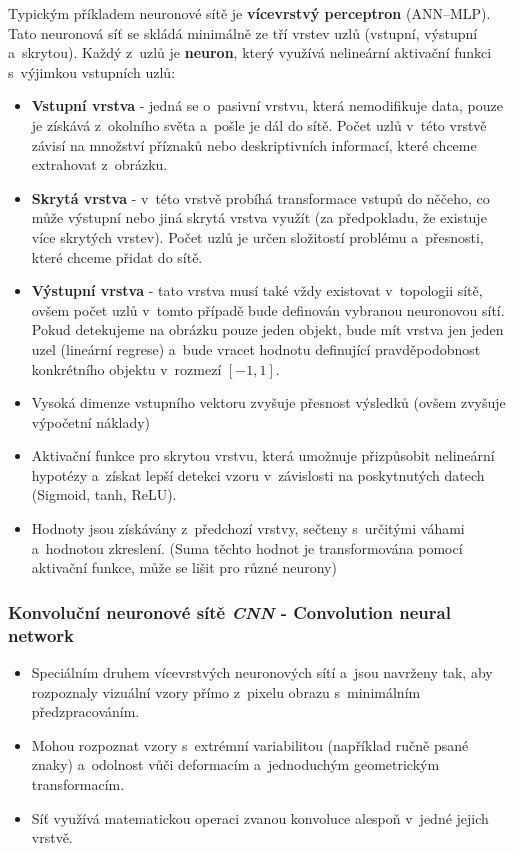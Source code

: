 Typickým příkladem neuronové sítě je \textbf{vícevrstvý perceptron} (ANN--MLP). Tato neuronová síť se skládá minimálně ze tří vrstev uzlů (vstupní, výstupní a~skrytou). Každý z~uzlů je \textbf{neuron}, který využívá nelineární aktivační funkci s~výjimkou vstupních uzlů:
\begin{itemize}
  \item{\textbf{Vstupní vrstva} - jedná se o~pasivní vrstvu, která nemodifikuje data, pouze je získává z~okolního světa a~pošle je dál do sítě. Počet uzlů v~této vrstvě závisí na množství příznaků nebo deskriptivních informací, které chceme extrahovat z~obrázku.}
  \item{\textbf{Skrytá vrstva} - v~této vrstvě probíhá transformace vstupů do něčeho, co může výstupní nebo jiná skrytá vrstva využít (za předpokladu, že existuje více skrytých vrstev). Počet uzlů je určen složitostí problému a~přesnosti, které chceme přidat do sítě.}
  \item{\textbf{Výstupní vrstva} - tato vrstva musí také vždy existovat v~topologii sítě, ovšem počet uzlů v~tomto případě bude definován vybranou neuronovou sítí. Pokud detekujeme na obrázku pouze jeden objekt, bude mít vrstva jen jeden uzel (lineární regrese) a~bude vracet hodnotu definující pravděpodobnost konkrétního objektu v~rozmezí $[-1,1]$.}
\end{itemize} 


\begin{itemize}
  \item Vysoká dimenze vstupního vektoru zvyšuje přesnost výsledků (ovšem zvyšuje výpočetní náklady)
  \item Aktivační funkce pro skrytou vrstvu, která umožnuje přizpůsobit nelineární hypotézy a~získat lepší detekci vzoru v~závislosti na poskytnutých datech (Sigmoid, tanh, ReLU).
  \item Hodnoty jsou získávány z~předchozí vrstvy, sečteny s~určitými váhami a~hodnotou zkreslení. (Suma těchto hodnot je transformována pomocí aktivační funkce, může se lišit pro různé neurony)
\end{itemize}

\subsubsection{Konvoluční neuronové sítě \textit{CNN} - Convolution neural network}
\begin{itemize}
  \item Speciálním druhem vícevrstvých neuronových sítí a~jsou navrženy tak, aby rozpoznaly vizuální vzory přímo z~pixelu obrazu s~minimálním předzpracováním.
  \item Mohou rozpoznat vzory s~extrémní variabilitou (například ručně psané znaky) a~odolnost vůči deformacím a~jednoduchým geometrickým transformacím.
  \item Síť využívá matematickou operaci zvanou konvoluce alespoň v~jedné jejich vrstvě.
\end{itemize}

